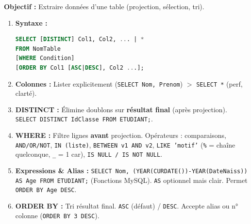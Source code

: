 \documentclass[11pt]{article}
\begin{document}
\begin{methode}
\textbf{Objectif :} Extraire données d'une table (projection, sélection, tri).
\begin{enumerate}
    \item \textbf{Syntaxe :}
\begin{lstlisting}[language=SQL]
SELECT [DISTINCT] Col1, Col2, ... | *
FROM NomTable
[WHERE Condition]
[ORDER BY Col1 [ASC|DESC], Col2 ...];
\end{lstlisting}
    \item \textbf{Colonnes :} Lister explicitement (\texttt{SELECT Nom, Prenom}) $>$ \texttt{SELECT *} (perf, clarté).
    \item \textbf{DISTINCT :} Élimine doublons sur \textbf{résultat final} (après projection). \texttt{SELECT DISTINCT IdClasse FROM ETUDIANT;}.
    \item \textbf{WHERE :} Filtre lignes \textbf{avant} projection. Opérateurs : comparaisons, \texttt{AND/OR/NOT}, \texttt{IN (liste)}, \texttt{BETWEEN v1 AND v2}, \texttt{LIKE 'motif'} (\texttt{\%} = chaîne quelconque, \texttt{\_} = 1 car), \texttt{IS NULL / IS NOT NULL}.
    \item \textbf{Expressions \& Alias :} \texttt{SELECT Nom, (YEAR(CURDATE())-YEAR(DateNaiss)) AS Age FROM ETUDIANT;} (Fonctions MySQL). \texttt{AS} optionnel mais clair. Permet \texttt{ORDER BY Age DESC}.
    \item \textbf{ORDER BY :} Tri résultat final. \texttt{ASC} (défaut) / \texttt{DESC}. Accepte alias ou n° colonne (\texttt{ORDER BY 3 DESC}).
\end{enumerate}
\end{methode}
\end{document}

